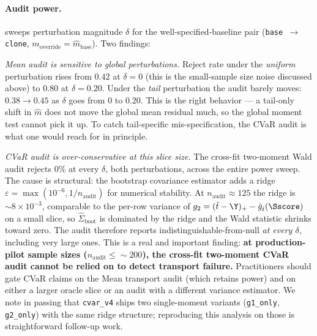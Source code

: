 \paragraph{Audit power.}


 sweeps perturbation magnitude $\delta$ for
the well-specified-baseline pair (\texttt{base $\to$ clone}, $m_{\text{override}}{=}\hat m_{\text{base}}$).
Two findings:

\textit{Mean audit is sensitive to global perturbations.} Reject rate
under the \emph{uniform} perturbation rises from $0.42$ at $\delta{=}0$
(this is the small-sample size noise discussed above) to $0.80$ at
$\delta{=}0.20$. Under the \emph{tail} perturbation the audit barely
moves: $0.38 \to 0.45$ as $\delta$ goes from $0$ to $0.20$. This is the
right behavior — a tail-only shift in $\hat m$ does not move the global
mean residual much, so the global moment test cannot pick it up. To catch
tail-specific mis-specification, the CVaR audit is what one would reach
for in principle.

\textit{CVaR audit is over-conservative at this slice size.} The cross-fit
two-moment Wald audit rejects $0\%$ at every $\delta$, both perturbations,
across the entire power sweep. The cause is structural: the bootstrap
covariance estimator adds a ridge $\varepsilon = \max(10^{-6},
1/n_{\text{audit}})$ for numerical stability. At $n_{\text{audit}}{\approx}125$
the ridge is $\sim 8\!\times\!10^{-3}$, comparable to the per-row variance
of $g_2 = (\hat t - \Y)_+ - \hat g_{\hat t}(\Sscore)$ on a small slice, so
$\hat\Sigma_{\text{boot}}$ is dominated by the ridge and the Wald
statistic shrinks toward zero. The audit therefore reports
indistinguishable-from-null \emph{at every $\delta$}, including very large
ones. This is a real and important finding: \textbf{at production-pilot
sample sizes ($n_{\text{audit}}{\le}\!\sim\!200$), the cross-fit two-moment
CVaR audit cannot be relied on to detect transport failure.} Practitioners
should gate CVaR claims on the Mean transport audit (which retains power)
and on either a larger oracle slice or an audit with a different variance
estimator. We note in passing that \texttt{cvar\_v4} ships two
single-moment variants (\texttt{g1\_only}, \texttt{g2\_only}) with the
same ridge structure; reproducing this analysis on those is straightforward
follow-up work.

